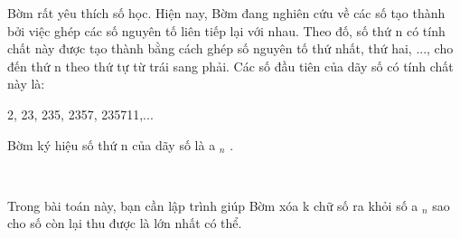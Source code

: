 Bờm rất yêu thích số học. Hiện nay, Bờm đang nghiên cứu về các số tạo thành bởi việc ghép các số nguyên tố liên tiếp lại với nhau. Theo đố, số thứ n có tính chất này được tạo thành bằng cách ghép số nguyên tố thứ nhất, thứ hai, ..., cho đến thứ n theo thứ tự từ trái sang phải. Các số đầu tiên của dãy số có tính chất này là:

2, 23, 235, 2357, 235711,...

Bờm ký hiệu số thứ n của dãy số là a $_ n $ .

 

Trong bài toán này, bạn cần lập trình giúp Bờm xóa k chữ số ra khỏi số a $_ n $ sao cho số còn lại thu được là lớn nhất có thể.

\